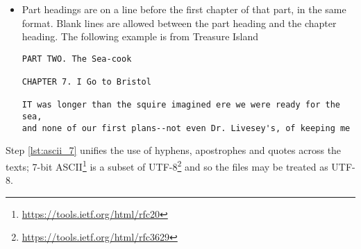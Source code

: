 \documentclass[a4paper,10pt]{paper}
\begin{document}
\begin{itemize}
        \begin{verbatim} CHAPTER 2. TRAVELLING COMPANIONS.\end{verbatim}
        \begin{verbatim} CHAPTER 3.\end{verbatim}
        \begin{verbatim} CHAPTER IV. Little Meg's Treat to Her Children\end{verbatim}
        \begin{verbatim} CHAPTER V.\end{verbatim}
        \begin{verbatim} BOOK 1.\end{verbatim}
        \begin{verbatim} BOOK II. Jessica's Mother\end{verbatim}
        Sections beginning with `INTRODUCTION', `PREFACE', `CONCLUSION', `PROLOGUE', `PRELUDE' or `MORAL' are also be treated as seperate chapters.
        These do not require numbers, but do require the dot.
        Again the heading can optionaly be followed by a title; the title must not break onto a new line.
        Here are some examples
        \begin{verbatim} PREFACE.\end{verbatim}
        \begin{verbatim} INTRODUCTION.\end{verbatim}
        \begin{verbatim} PROLOGUE. THE OLYMPIANS\end{verbatim}
        \begin{verbatim} MORAL.--_There is no moral to this chapter._\end{verbatim}
        In all cases there must be no space at the beginning of the line.
    \item Part headings are on a line before the first chapter of that part, in the same format. Blank lines are allowed between the part heading and the chapter heading.
          The following example is from Treasure Island
      \begin{verbatim}PART TWO. The Sea-cook

CHAPTER 7. I Go to Bristol

IT was longer than the squire imagined ere we were ready for the sea,
and none of our first plans--not even Dr. Livesey's, of keeping me\end{verbatim}
\end{itemize}

Step \ref{lst:ascii_7} unifies the use of hyphens, apostrophes and quotes across the texts; 7-bit ASCII\footnote{\url{https://tools.ietf.org/html/rfc20}} is a subset of UTF-8\footnote{\url{https://tools.ietf.org/html/rfc3629}} and so the files may be treated as UTF-8.
\end{document}
